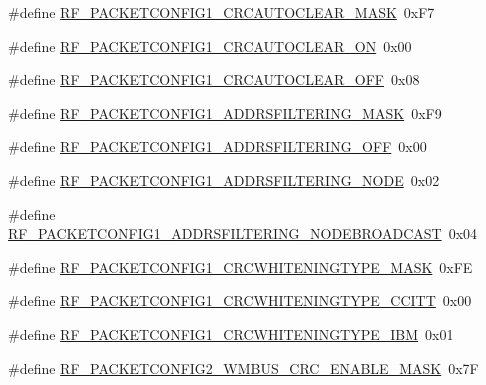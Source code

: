 \begin{DoxyCompactItemize}
\item 
\#define \mbox{\hyperlink{sx1276_regs-_fsk_8h_a71ef80b56ede94b1e6f5216296a549a2}{R\+F\+\_\+\+P\+A\+C\+K\+E\+T\+C\+O\+N\+F\+I\+G1\+\_\+\+C\+R\+C\+A\+U\+T\+O\+C\+L\+E\+A\+R\+\_\+\+M\+A\+SK}}~0x\+F7
\item 
\#define \mbox{\hyperlink{sx1276_regs-_fsk_8h_ab08c36961942390a8d7bf306c3811bca}{R\+F\+\_\+\+P\+A\+C\+K\+E\+T\+C\+O\+N\+F\+I\+G1\+\_\+\+C\+R\+C\+A\+U\+T\+O\+C\+L\+E\+A\+R\+\_\+\+ON}}~0x00
\item 
\#define \mbox{\hyperlink{sx1276_regs-_fsk_8h_a5657b8ed002c1fa8240195094ae616d3}{R\+F\+\_\+\+P\+A\+C\+K\+E\+T\+C\+O\+N\+F\+I\+G1\+\_\+\+C\+R\+C\+A\+U\+T\+O\+C\+L\+E\+A\+R\+\_\+\+O\+FF}}~0x08
\item 
\#define \mbox{\hyperlink{sx1276_regs-_fsk_8h_aa6ade0d8733661fe9b5909e83f82ff8d}{R\+F\+\_\+\+P\+A\+C\+K\+E\+T\+C\+O\+N\+F\+I\+G1\+\_\+\+A\+D\+D\+R\+S\+F\+I\+L\+T\+E\+R\+I\+N\+G\+\_\+\+M\+A\+SK}}~0x\+F9
\item 
\#define \mbox{\hyperlink{sx1276_regs-_fsk_8h_ae1c5b653c3eaf3484aa55b58fcd6f4f0}{R\+F\+\_\+\+P\+A\+C\+K\+E\+T\+C\+O\+N\+F\+I\+G1\+\_\+\+A\+D\+D\+R\+S\+F\+I\+L\+T\+E\+R\+I\+N\+G\+\_\+\+O\+FF}}~0x00
\item 
\#define \mbox{\hyperlink{sx1276_regs-_fsk_8h_a5ead47f6e17c82b0ac7cb3d9c0f63f7c}{R\+F\+\_\+\+P\+A\+C\+K\+E\+T\+C\+O\+N\+F\+I\+G1\+\_\+\+A\+D\+D\+R\+S\+F\+I\+L\+T\+E\+R\+I\+N\+G\+\_\+\+N\+O\+DE}}~0x02
\item 
\#define \mbox{\hyperlink{sx1276_regs-_fsk_8h_aa303faf2ff47ba50805b1f4f51f6d012}{R\+F\+\_\+\+P\+A\+C\+K\+E\+T\+C\+O\+N\+F\+I\+G1\+\_\+\+A\+D\+D\+R\+S\+F\+I\+L\+T\+E\+R\+I\+N\+G\+\_\+\+N\+O\+D\+E\+B\+R\+O\+A\+D\+C\+A\+ST}}~0x04
\item 
\#define \mbox{\hyperlink{sx1276_regs-_fsk_8h_a8062626f245aa20c2a325b831b908f0f}{R\+F\+\_\+\+P\+A\+C\+K\+E\+T\+C\+O\+N\+F\+I\+G1\+\_\+\+C\+R\+C\+W\+H\+I\+T\+E\+N\+I\+N\+G\+T\+Y\+P\+E\+\_\+\+M\+A\+SK}}~0x\+FE
\item 
\#define \mbox{\hyperlink{sx1276_regs-_fsk_8h_a618462d2aed522dc17aaa596d7dd982d}{R\+F\+\_\+\+P\+A\+C\+K\+E\+T\+C\+O\+N\+F\+I\+G1\+\_\+\+C\+R\+C\+W\+H\+I\+T\+E\+N\+I\+N\+G\+T\+Y\+P\+E\+\_\+\+C\+C\+I\+TT}}~0x00
\item 
\#define \mbox{\hyperlink{sx1276_regs-_fsk_8h_abb45d698c0e2e726d9754315bd4d3829}{R\+F\+\_\+\+P\+A\+C\+K\+E\+T\+C\+O\+N\+F\+I\+G1\+\_\+\+C\+R\+C\+W\+H\+I\+T\+E\+N\+I\+N\+G\+T\+Y\+P\+E\+\_\+\+I\+BM}}~0x01
\item 
\#define \mbox{\hyperlink{sx1276_regs-_fsk_8h_a57d39324128c8750f93dabdbdff3f22a}{R\+F\+\_\+\+P\+A\+C\+K\+E\+T\+C\+O\+N\+F\+I\+G2\+\_\+\+W\+M\+B\+U\+S\+\_\+\+C\+R\+C\+\_\+\+E\+N\+A\+B\+L\+E\+\_\+\+M\+A\+SK}}~0x7F

\end{DoxyCompactItemize}

